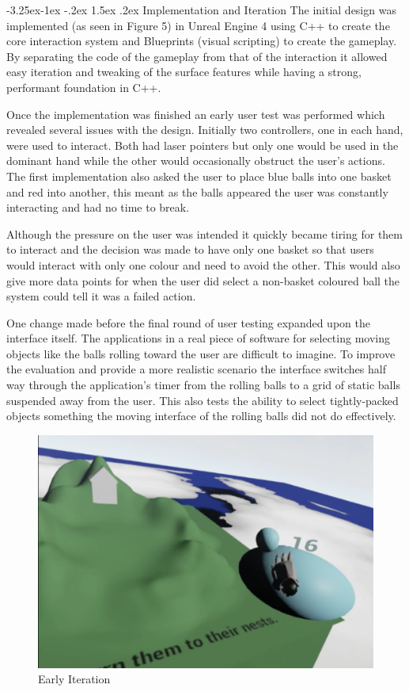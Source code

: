 \documentclass[12pt]{article}
\makeatletter
\renewcommand{\subsubsection}{\@startsection{subsubsection}{2}{\z@}%
             {-3.25ex\@plus -1ex \@minus -.2ex}%
             {1.5ex \@plus .2ex}%
             {\normalfont\normalsize\scshape\bfseries}}
\makeatother
\begin{document}
\subsubsection{Implementation and Iteration}
The initial design was implemented (as seen in Figure 5) in Unreal Engine 4 using C++ to create the core interaction system and Blueprints (visual scripting) to create the gameplay. By separating the code of the gameplay from that of the interaction it allowed easy iteration and tweaking of the surface features while having a strong, performant foundation in C++. 

Once the implementation was finished an early user test was performed which revealed several issues with the design. Initially two controllers, one in each hand, were used to interact. Both had laser pointers but only one would be used in the dominant hand while the other would occasionally obstruct the user's actions. The first implementation also asked the user to place blue balls into one basket and red into another, this meant as the balls appeared the user was constantly interacting and had no time to break.

Although the pressure on the user was intended it quickly became tiring for them to interact and the decision was made to have only one basket so that users would interact with only one colour and need to avoid the other. This would also give more data points for when the user did select a non-basket coloured ball the system could tell it was a failed action.

One change made before the final round of user testing expanded upon the interface itself. The applications in a real piece of software for selecting moving objects like the balls rolling toward the user are difficult to imagine. To improve the evaluation and provide a more realistic scenario the interface switches half way through the application's timer from the rolling balls to a grid of static balls suspended away from the user. This also tests the ability to select tightly-packed objects something the moving interface of the rolling balls did not do effectively.

\begin{figure}
\centering
  \includegraphics[width=.8\linewidth]{earlydemo.png}
  \caption{Early Iteration}
\end{figure}
\end{document}
